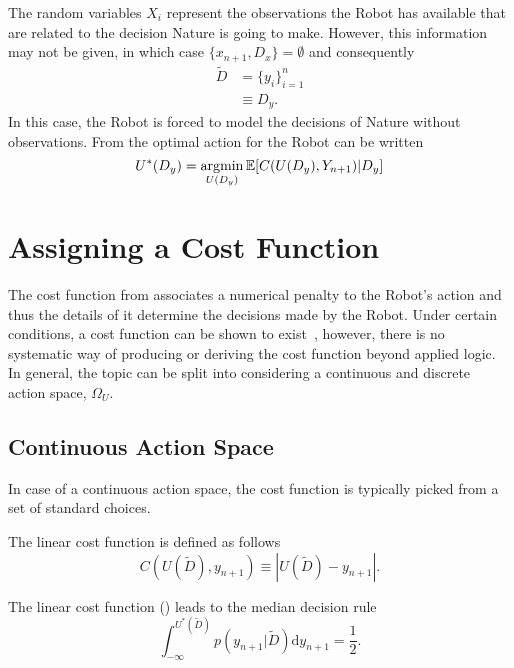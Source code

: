 \begin{example}
	The random variables $X_i$ represent the observations the Robot has available that are related to the decision Nature is going to make. However, this information may not be given, in which case $\{x_{n+1},D_x\}=\emptyset$ and consequently
	\begin{equation}
		\begin{split}
			\tilde{D} &=\{y_i\}_{i=1}^n\\
			&\equiv D_y.
		\end{split}
	\end{equation}
	In this case, the Robot is forced to model the decisions of Nature without observations. From  the optimal action for the Robot can be written
	\begin{equation}
		U^*(D_y) = \operatorname*{argmin}_{U(D_y)} \mathbb{E}[C(U(D_y), Y_{n+1})|D_y]
		\label{eq:best_decision1}
	\end{equation}
\end{example}

\section{Assigning a Cost Function}
\label{sec:assing_cost}
The cost function from  associates a numerical penalty to the Robot's action and thus the details of it determine the decisions made by the Robot. Under certain conditions, a cost function can be shown to exist~\cite{lavalle2006planning}, however, there is no systematic way of producing or deriving the cost function beyond applied logic. In general, the topic can be split into considering a continuous and discrete action space, $\Omega_U$. 	

\subsection{Continuous Action Space}
In case of a continuous action space, the cost function is typically picked from a set of standard choices.	
\begin{definition}
	\label{def:linear_cost_function}
	The linear cost function is defined as follows
	\begin{equation}
		C(U(\tilde{D}),y_{n+1}) \equiv |U(\tilde{D})-y_{n+1}|.
	\end{equation}	
\end{definition}

\begin{theorem}
	\label{theorem:median_decision_rule}
	The linear cost function () leads to the median decision rule
	\begin{equation}
		\int_{-\infty}^{U^*(\tilde{D})} p(y_{n+1}|\tilde{D})\mathrm{d}y_{n+1} = \frac{1}{2}.
	\end{equation}
\end{theorem}


